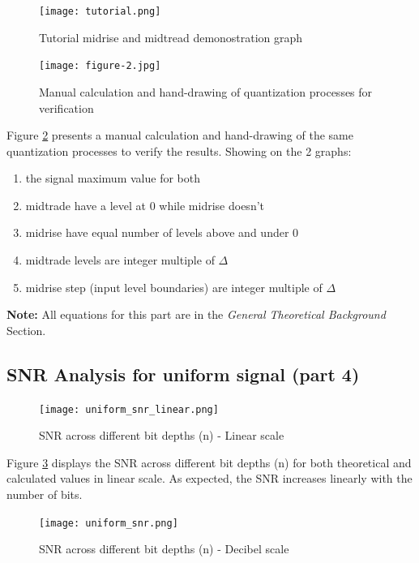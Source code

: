 \documentclass{article}
\begin{document}
\begin{figure}[H]
    \centering
    \texttt{[image: tutorial.png]}
    \caption{Tutorial midrise and midtread demonostration graph}
    \label{fig:tutorial}
\end{figure}


\begin{figure}[H]
    \centering
    \texttt{[image: figure-2.jpg]}
    \caption{Manual calculation and hand-drawing of quantization processes for verification}
    \label{fig:manual_calc}
\end{figure}

Figure \ref{fig:manual_calc} presents a manual calculation and hand-drawing of the same quantization processes to verify the results. Showing on the 2 graphs:

\begin{enumerate}
    \item{the signal maximum value for both}
    \item{midtrade have a level at 0 while midrise doesn't}
    \item{midrise have equal number of levels above and under 0}
    \item{midtrade levels are integer multiple of $\Delta$}
    \item{midrise step (input level boundaries) are integer multiple of $\Delta$}
\end{enumerate}

\textbf{Note:} All equations for this part are in the \textit{General Theoretical Background} Section.


\subsection{SNR Analysis for uniform signal (part 4)}

\begin{figure}[H]
    \centering
    \texttt{[image: uniform\_snr\_linear.png]}
    \caption{SNR across different bit depths (n) - Linear scale}
    \label{fig:snr_linear}
\end{figure}

Figure \ref{fig:snr_linear} displays the SNR across different bit depths (n) for both theoretical and calculated values in linear scale. As expected, the SNR increases linearly with the number of bits.

\begin{figure}[H]
    \centering
    \texttt{[image: uniform\_snr.png]}
    \caption{SNR across different bit depths (n) - Decibel scale}
    \label{fig:snr_db}
\end{figure}
\end{document}
